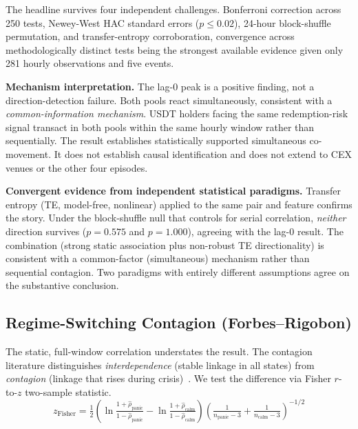 \documentclass[sigconf,anonymous]{acmart}
\begin{document}
The headline survives four independent challenges. Bonferroni correction across
250 tests, Newey-West HAC standard errors ($p\le0.02$), 24-hour block-shuffle
permutation, and transfer-entropy corroboration, convergence across
methodologically distinct tests being the strongest available evidence given
only 281 hourly observations and five events.

\textbf{Mechanism interpretation.}
The lag-0 peak is a positive finding, not a direction-detection failure.  Both pools react simultaneously, consistent with a \emph{common-information mechanism}. USDT holders facing the same redemption-risk signal transact in both pools within the same hourly window rather than sequentially.  The result establishes statistically supported simultaneous co-movement. It does not establish causal identification and does not extend to CEX venues or the other four episodes.

\textbf{Convergent evidence from independent statistical paradigms.}
Transfer entropy (TE, model-free, nonlinear) applied to the same pair and feature confirms the story. Under the block-shuffle null that controls for serial correlation, \emph{neither} direction survives ($p=0.575$ and $p=1.000$), agreeing with the lag-0 result.  The combination (strong static association plus non-robust TE directionality) is consistent with a common-factor (simultaneous) mechanism rather than sequential contagion.  Two paradigms with entirely different assumptions agree on the substantive conclusion.



\subsection{Regime-Switching Contagion (Forbes--Rigobon)}
\label{sec:regime}

The static, full-window correlation understates the result.  The contagion
literature distinguishes \emph{interdependence} (stable linkage in all states) from
\emph{contagion} (linkage that rises during crisis)~\cite{Forbes2002}.  We test
the difference via Fisher $r$-to-$z$ two-sample statistic.
\begin{equation}
  z_{\text{Fisher}} = \tfrac{1}{2}\!\left( \ln\tfrac{1+\hat{\rho}_{\text{panic}}}{1-\hat{\rho}_{\text{panic}}}  - \ln\tfrac{1+\hat{\rho}_{\text{calm}}}{1-\hat{\rho}_{\text{calm}}} \right)
  \!\left( \tfrac{1}{n_{\text{panic}}-3} + \tfrac{1}{n_{\text{calm}}-3} \right)^{-1/2}
\end{equation}
\end{document}

